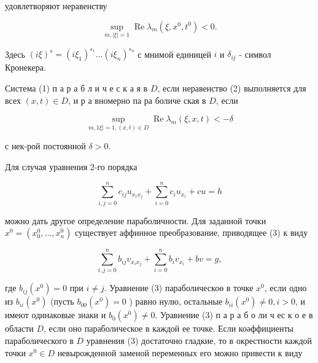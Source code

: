 \documentclass[10pt]{article}
\begin{document}
удовлетворяют неравенству



\[

\sup _{m,|\xi|=1} \operatorname{Re} \lambda_{m}\left(\xi, x^{0}, t^{0}\right)<0 .

\]



Здесь $(i \xi)^{s}=\left(i \xi_{1}\right)^{s_{1}} \ldots\left(i \xi_{n}\right)^{s_{n}}$ с мнимой единицей $i$ и $\delta_{i j}$ - символ Кронекера.



Система (1) п а р а б л и ч е с к а я в $D$, если неравенство (2) выполняется для всех $(x, t) \in D$, и р а вномерно па ра боличе ская в $D$, если



\[

\sup _{m, 1 \xi \mid=1,(x, t) \in D} \operatorname{Re} \lambda_{m}(\xi, x, t)<-\delta

\]



с нек-рой постоянной $\delta>0$.



Для случая уравнения 2-го порядка



\[

\sum_{i, j=0}^{n} c_{i j} u_{x_{i} x_{j}}+\sum_{i=0}^{n} c_{i} u_{x_{i}}+c u=h

\]



можно дать другое определение параболичности. Для заданной точки $x^{0}=\left(x_{0}^{0}, \ldots, x_{n}^{0}\right)$ существует аффинное преобразование, приводящее (3) к виду



\[

\sum_{i, j=0}^{n} b_{i j} v_{x_{i} x_{j}}+\sum_{i=0}^{n} b_{i} v_{x_{i}}+b v=g,

\]



где $b_{i j}\left(x^{0}\right)=0$ при $i \neq j$. Уравнение (3) параболическоө в точке $x^{0}$, если одно из $b_{i i}\left(x^{0}\right)$ (пусть $b_{00}\left(x^{0}\right)=0$ ) равно нулю, остальные $b_{i i}\left(x^{0}\right) \neq 0, i>0$, и имеют одинаковые знаки и $b_{0}\left(x^{0}\right) \neq 0$. Уравнение (3) п а р а б о ли ч ес к о е в области $D$, если оно параболическое в каждой ее точке. Если коәффициенты параболического в $D$ уравнения (3) достаточно гладкие, то в окрестности каждой точки $x^{0} \in D$ невырожденной заменой переменных его можно привести к виду
\end{document}
